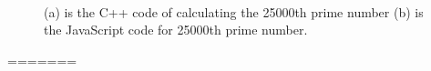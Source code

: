 \documentclass[conference]{IEEEtran}
\begin{document}
\begin{figure}[hbt!]
		\label{figure:prime}
         \centering{}
        \centering{}\\ %
    \caption{(a) is the C++ code of calculating the 25000th prime number (b) is the JavaScript code for 25000th prime number.}
\end{figure}
=======
%
%
%
%
%
%
\end{document}
